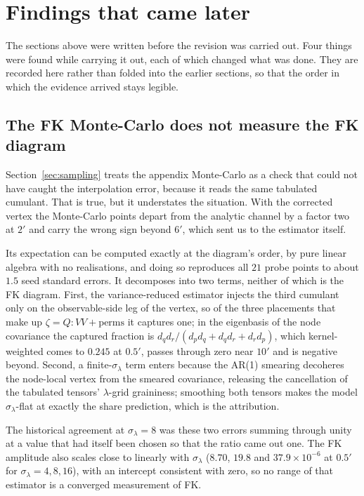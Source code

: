 \section{Findings that came later}
\label{sec:afterwards}

The sections above were written before the revision was carried out. Four
things were found while carrying it out, each of which changed what was done.
They are recorded here rather than folded into the earlier sections, so that
the order in which the evidence arrived stays legible.

\subsection{The FK Monte-Carlo does not measure the FK diagram}

Section~\ref{sec:sampling} treats the appendix Monte-Carlo as a check that
could not have caught the interpolation error, because it reads the same
tabulated cumulant. That is true, but it understates the situation. With the
corrected vertex the Monte-Carlo points depart from the analytic channel by a
factor two at $2'$ and carry the wrong sign beyond $6'$, which sent us to the
estimator itself.

Its expectation can be computed exactly at the diagram's order, by pure linear
algebra with no realisations, and doing so reproduces all $21$ probe points to
about $1.5$ seed standard errors. It decomposes into two terms, neither of
which is the FK diagram. First, the variance-reduced estimator injects the
third cumulant only on the observable-side leg of the vertex, so of the three
placements that make up $\zeta = Q\!:\!VV + \text{perms}$ it captures one; in
the eigenbasis of the node covariance the captured fraction is
$d_q d_r/(d_p d_q + d_q d_r + d_r d_p)$, which kernel-weighted comes to
$0.245$ at $0.5'$, passes through zero near $10'$ and is negative beyond.
Second, a finite-$\sigma_\lambda$ term enters because the AR(1) smearing
decoheres the node-local vertex from the smeared covariance, releasing the
cancellation of the tabulated tensors' $\lambda$-grid graininess; smoothing
both tensors makes the model $\sigma_\lambda$-flat at exactly the share
prediction, which is the attribution.

The historical agreement at $\sigma_\lambda=8$ was these two errors summing
through unity at a value that had itself been chosen so that the ratio came
out one. The FK amplitude also scales close to linearly with
$\sigma_\lambda$ ($8.70$, $19.8$ and $37.9\times10^{-6}$ at $0.5'$ for
$\sigma_\lambda=4,8,16$), with an intercept consistent with zero, so no range
of that estimator is a converged measurement of FK.

